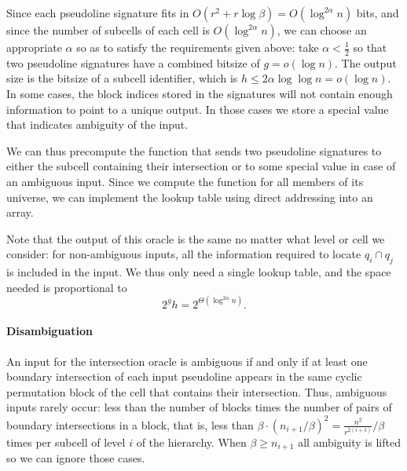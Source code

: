 Since each pseudoline signature fits in
\(O(r^2 + r \log \beta) = O(\log^{2\alpha}{n})\)
bits,
and since the number of subcells of each cell is \(O(\log^{2\alpha}{n})\),
we can choose an appropriate \(\alpha\) so as to satisfy the requirements given
above:
take \(\alpha < \frac 12\) so that two pseudoline signatures
have a combined bitsize of \(g = o(\log n)\).
The output size is the bitsize of a subcell identifier, which is \(h \leq 2
\alpha \log \log n = o(\log n)\).
%
In some cases, the block indices stored in the signatures will not contain
enough information to point to a unique output. In those cases we store a
special value that indicates ambiguity of the input.

We can thus precompute the function that sends two pseudoline
signatures to either the subcell containing their intersection or to some
special value in case of an ambiguous input. Since we compute the function for
all members of its universe, we can implement the lookup table using
direct addressing into an array.

Note that the output of this oracle is the same no matter what level or cell we
consider: for non-ambiguous inputs, all the information required to locate
\(q_i \cap q_j\) is included in the input.
We thus only need a single lookup table, and the space needed is proportional to
\begin{displaymath}
  2^g h
  =
  2^{\Theta(\log^{2\alpha} n)}.
\end{displaymath}

\paragraph*{Disambiguation}
An input for the intersection oracle is ambiguous if and only if at least one
boundary intersection of each input pseudoline appears in the same cyclic
permutation block of the cell that contains their intersection.
%
Thus, ambiguous inputs rarely occur:
%
less than the number of blocks times the number of pairs of boundary
intersections in a block,
%
that is, less than
\(
\beta \cdot {({n_{i+1}} / \beta)}^2
=
\frac{n^2}{r^{2(i+1)}} / \beta
\)
times per subcell of level \(i\) of the hierarchy.
%
When \(\beta \geq n_{i+1}\) all ambiguity is lifted so we can ignore
those cases.

